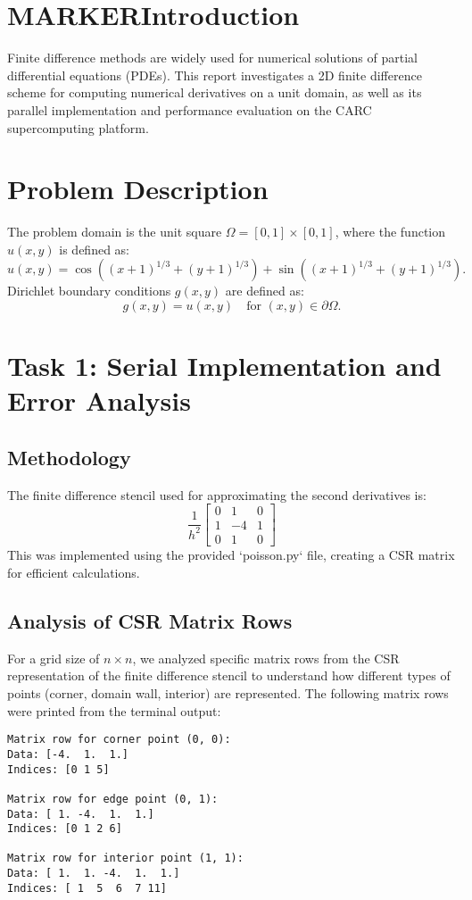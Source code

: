 \documentclass[12pt]{article}
\begin{document}
\section{MARKERIntroduction}
Finite difference methods are widely used for numerical solutions of
 partial differential equations (PDEs). This report investigates a 2D 
 finite difference scheme for computing numerical derivatives on a unit 
 domain, as well as its parallel implementation and performance evaluation 
 on the CARC supercomputing platform.

\section{Problem Description}
The problem domain is the unit square \(\Omega = [0, 1] \times [0, 1]\), where the function \(u(x, y)\) is defined as:
\[
u(x, y) = \cos((x+1)^{1/3} + (y+1)^{1/3}) + \sin((x+1)^{1/3} + (y+1)^{1/3}).
\]
Dirichlet boundary conditions \(g(x, y)\) are defined as:
\[
g(x, y) = u(x, y) \quad \text{for } (x, y) \in \partial \Omega.
\]

\section{Task 1: Serial Implementation and Error Analysis}
\subsection{Methodology}
The finite difference stencil used for approximating the second derivatives is:
\[
\frac{1}{h^2} \begin{bmatrix} 0 & 1 & 0 \\ 1 & -4 & 1 \\ 0 & 1 & 0 \end{bmatrix}
\]
This was implemented using the provided `poisson.py` file, creating a CSR matrix for efficient calculations.

\subsection{Analysis of CSR Matrix Rows}
For a grid size of \( n \times n \), we analyzed specific matrix rows from the CSR representation of the finite difference stencil to understand how different types of points (corner, domain wall, interior) are represented. The following matrix rows were printed from the terminal output:

\begin{verbatim}
Matrix row for corner point (0, 0):
Data: [-4.  1.  1.]
Indices: [0 1 5]

Matrix row for edge point (0, 1):
Data: [ 1. -4.  1.  1.]
Indices: [0 1 2 6]

Matrix row for interior point (1, 1):
Data: [ 1.  1. -4.  1.  1.]
Indices: [ 1  5  6  7 11]
\end{verbatim}
\end{document}
